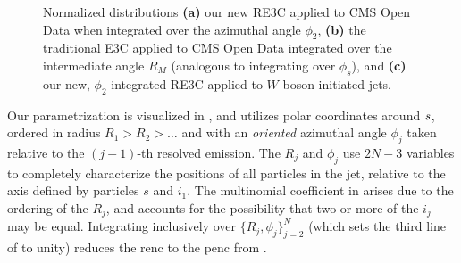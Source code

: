 \begin{figure}
\centering
    \caption[Three-point energy correlators integrated over azimuthal angle.]{
        Normalized distributions \textbf{(a)} our new RE3C applied to CMS Open Data when integrated over the azimuthal angle \(\phi_2\), \textbf{(b)} the traditional E3C applied to CMS Open Data integrated over the intermediate angle $R_M$ (analogous to integrating over \(\phi_s\)), and \textbf{(c)} our new, \(\phi_2\)-integrated RE3C applied to $W$-boson-initiated jets.
    }
	\label{fig:density}%
\end{figure}





Our parametrization is visualized in , and utilizes polar coordinates around $s$, ordered in radius $R_1 \! > \! R_2 \! > \! \dots$ and with an \emph{oriented} azimuthal angle $\phi_j$ taken relative to the $(j\!-\!1)$-th resolved emission.
%
The \(R_j\) and \(\phi_j\) use \(2N-3\) variables to completely characterize the positions of all particles in the jet, relative to the axis defined by particles \(s\) and \(i_1\).
%
The multinomial coefficient in  arises due to the ordering of the \(R_j\), and accounts for the possibility that two or more of the $i_j$ may be equal.
%
Integrating inclusively over $\{R_j, \phi_j\}_{j=2}^{N}$ (which sets the third line of  to unity) reduces the \gls{renc} to the \gls{penc} from .


